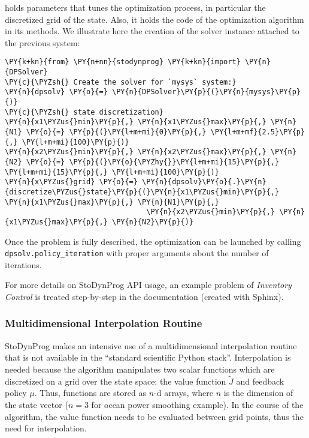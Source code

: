 \documentclass[letterpaper,compsoc,twoside]{IEEEtran}
\makeatletter
\def\PY@reset{\let\PY@it=\relax \let\PY@bf=\relax \let\PY@ul=\relax \let\PY@tc=\relax \let\PY@bc=\relax \let\PY@ff=\relax}
\def\PY@tok#1{\csname PY@tok@#1\endcsname}
\def\PY@toks#1+{\ifx\relax#1\empty\else \PY@tok{#1}\expandafter\PY@toks\fi}
\def\PY@do#1{\PY@bc{\PY@tc{\PY@ul{\PY@it{\PY@bf{\PY@ff{#1}}}}}}}
\def\PY#1#2{\PY@reset\PY@toks#1+\relax+\PY@do{#2}}
\def\PYZus{\char`\_}
\def\PYZsh{\char`\#}
\def\PYZhy{\char`\-}
\makeatother
\begin{document}
holds parameters that tunes the optimization process, in particular the
discretized grid of the state. Also, it holds the code of the
optimization algorithm in its methods. We illustrate here the creation
of the solver instance attached to the previous system:\begin{Verbatim}[commandchars=\\\{\},fontsize=\footnotesize]
\PY{k+kn}{from} \PY{n+nn}{stodynprog} \PY{k+kn}{import} \PY{n}{DPSolver}
\PY{c}{\PYZsh{} Create the solver for `mysys` system:}
\PY{n}{dpsolv} \PY{o}{=} \PY{n}{DPSolver}\PY{p}{(}\PY{n}{mysys}\PY{p}{)}
\PY{c}{\PYZsh{} state discretization}
\PY{n}{x1\PYZus{}min}\PY{p}{,} \PY{n}{x1\PYZus{}max}\PY{p}{,} \PY{n}{N1} \PY{o}{=} \PY{p}{(}\PY{l+m+mi}{0}\PY{p}{,} \PY{l+m+mf}{2.5}\PY{p}{,} \PY{l+m+mi}{100}\PY{p}{)}
\PY{n}{x2\PYZus{}min}\PY{p}{,} \PY{n}{x2\PYZus{}max}\PY{p}{,} \PY{n}{N2} \PY{o}{=} \PY{p}{(}\PY{o}{\PYZhy{}}\PY{l+m+mi}{15}\PY{p}{,} \PY{l+m+mi}{15}\PY{p}{,} \PY{l+m+mi}{100}\PY{p}{)}
\PY{n}{x\PYZus{}grid} \PY{o}{=} \PY{n}{dpsolv}\PY{o}{.}\PY{n}{discretize\PYZus{}state}\PY{p}{(}\PY{n}{x1\PYZus{}min}\PY{p}{,} \PY{n}{x1\PYZus{}max}\PY{p}{,} \PY{n}{N1}\PY{p}{,}
                                 \PY{n}{x2\PYZus{}min}\PY{p}{,} \PY{n}{x1\PYZus{}max}\PY{p}{,} \PY{n}{N2}\PY{p}{)}
\end{Verbatim}
Once the problem is fully described, the optimization can be launched by
calling \texttt{dpsolv.policy\_iteration} with proper arguments about the
number of iterations.

For more details on StoDynProg API usage, an example problem of
\emph{Inventory Control} is treated step-by-step in the documentation
(created with Sphinx).

\subsubsection{Multidimensional Interpolation Routine\label{multidimensional-interpolation-routine}\label{sss-multi-interp}}


StoDynProg makes an intensive use of a multidimensional interpolation
routine that is not available in the “standard scientific Python stack”.
Interpolation is needed because the algorithm manipulates two scalar
functions which are discretized on a grid over the state space: the
value function $\tilde{J}$ and feedback policy $\mu$. Thus,
functions are stored as $n$-d arrays, where $n$ is the
dimension of the state vector ($n=3$ for ocean power smoothing
example). In the course of the algorithm, the value function needs to be
evaluated between grid points, thus the need for interpolation.
\end{document}
